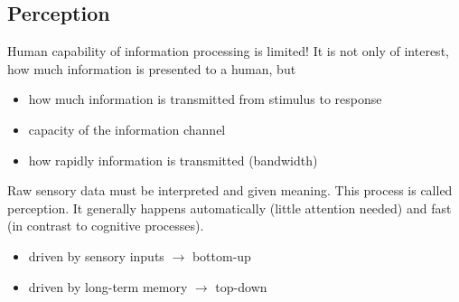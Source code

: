 \subsection{Perception}
Human capability of information processing is limited! It is not only of interest, how much information is presented to a human, but
\begin{itemize}
\item how much information is transmitted from stimulus to response
\item capacity of the information channel
\item how rapidly information is transmitted (bandwidth)
\end{itemize}
Raw sensory data must be interpreted and given meaning. This process is called perception. It generally happens automatically (little attention needed) and fast (in contrast to cognitive processes).
\begin{itemize}
\item driven by sensory inputs $\rightarrow$ bottom-up
\item driven by long-term memory $\rightarrow$ top-down
\end{itemize}


